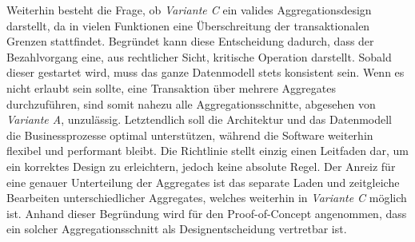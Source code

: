 Weiterhin besteht die Frage, ob \emph{Variante C} ein valides Aggregationsdesign darstellt, da in vielen Funktionen eine Überschreitung der transaktionalen Grenzen stattfindet. Begründet kann diese Entscheidung dadurch, dass der Bezahlvorgang eine, aus rechtlicher Sicht, kritische Operation darstellt. Sobald dieser gestartet wird, muss das ganze Datenmodell stets konsistent sein. Wenn es nicht erlaubt sein sollte, eine Transaktion über mehrere Aggregates durchzuführen, sind somit nahezu alle Aggregationsschnitte, abgesehen von \emph{Variante A}, unzulässig. Letztendlich soll die Architektur und das Datenmodell die Businessprozesse optimal unterstützen, während die Software weiterhin flexibel und performant bleibt. Die Richtlinie stellt einzig einen Leitfaden dar, um ein korrektes Design zu erleichtern, jedoch keine absolute Regel. Der Anreiz für eine genauer Unterteilung der Aggregates ist das separate Laden und zeitgleiche Bearbeiten unterschiedlicher Aggregates, welches weiterhin in \emph{Variante C} möglich ist. Anhand dieser Begründung wird für den Proof-of-Concept angenommen, dass ein solcher Aggregationsschnitt als Designentscheidung vertretbar ist. 

